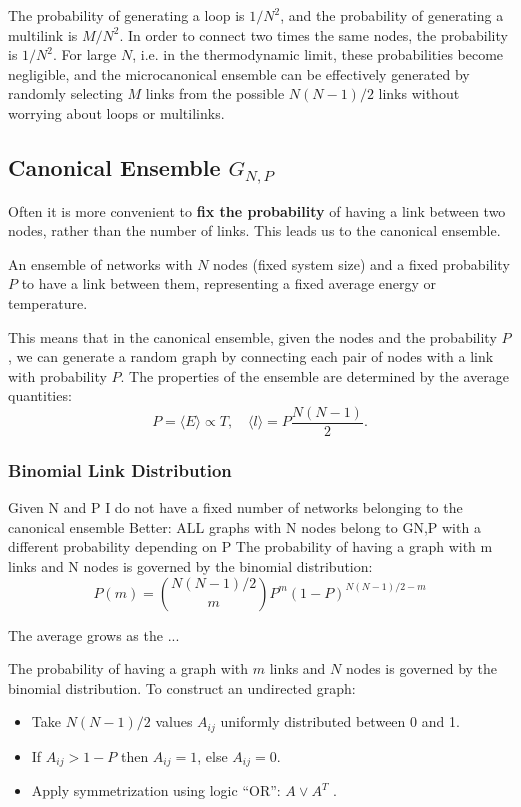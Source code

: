 The probability of generating a loop is $1/N^2$, and the probability of generating a multilink is $M/N^2$. In order to connect two times the same nodes, the probability is $1/N^2$. For large $N$, i.e. in the thermodynamic limit, these probabilities become negligible, and the microcanonical ensemble can be effectively generated by randomly selecting $M$ links from the possible $N(N-1)/2$ links without worrying about loops or multilinks.

\subsection{Canonical Ensemble $G_{N,P}$}

Often it is more convenient to \textbf{fix the probability} of having a link between two nodes, rather than the number of links. This leads us to the canonical ensemble.

\begin{definition}
    An ensemble of networks with $N$ nodes (fixed system size) and a fixed probability $P$ to have a link between them, representing a fixed average energy or temperature.
\end{definition}

This means that in the canonical ensemble, given the nodes and the probability $P$, we can generate a random graph by connecting each pair of nodes with a link with probability $P$. The properties of the ensemble are determined by the average quantities:
\[
    P = \langle E \rangle \propto T, \quad \langle l \rangle = P \frac{N(N-1)}{2}.
\]

\subsubsection{Binomial Link Distribution}

Given N and P I do not have a fixed number of
networks belonging to the canonical ensemble
Better: ALL graphs with N nodes belong to GN,P with
a different probability depending on P
The probability of having a graph with m links and N
nodes is governed by the binomial distribution:
\[
    P(m) = \binom{N(N-1)/2}{m} P^m (1-P)^{N(N-1)/2-m}
\]

The average grows as the ...

\begin{remark}
    The probability of having a graph with $m$ links and $N$ nodes is governed by the binomial distribution.
    To construct an undirected graph:
    \begin{itemize}
        \item Take $N(N-1)/2$ values $A_{ij}$ uniformly distributed between 0 and 1.
        \item If $A_{ij} > 1-P$ then $A_{ij}=1$, else $A_{ij}=0$.
        \item Apply symmetrization using logic ``OR'': $A \vee A^T$ .
    \end{itemize}
\end{remark}

